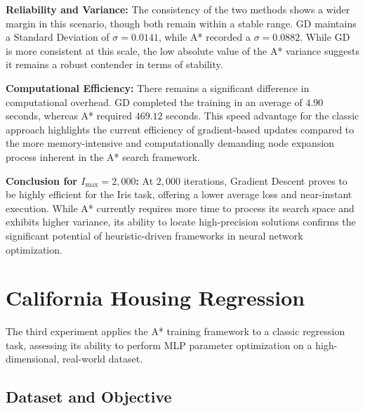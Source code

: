 \noindent \textbf{Reliability and Variance:} The consistency of the two methods shows a wider margin in this scenario, though both remain within a stable range. GD maintains a Standard Deviation of $\sigma = 0.0141$, while A* recorded a $\sigma = 0.0882$. While GD is more consistent at this scale, the low absolute value of the A* variance suggests it remains a robust contender in terms of stability.

\noindent \textbf{Computational Efficiency:} There remains a significant difference in computational overhead. GD completed the training in an average of $4.90$ seconds, whereas A* required $469.12$ seconds. This speed advantage for the classic approach highlights the current efficiency of gradient-based updates compared to the more memory-intensive and computationally demanding node expansion process inherent in the A* search framework.

\noindent \textbf{Conclusion for $I_{\text{max}}=2,000$:} At $2,000$ iterations, Gradient Descent proves to be highly efficient for the Iris task, offering a lower average loss and near-instant execution. While A* currently requires more time to process its search space and exhibits higher variance, its ability to locate high-precision solutions confirms the significant potential of heuristic-driven frameworks in neural network optimization.

 
\newpage

\section{California Housing Regression}
\label{sec:california_housing}

\noindent The third experiment applies the A* training framework to a classic regression task, assessing its ability to perform MLP parameter optimization on a high-dimensional, real-world dataset.

\subsection{Dataset and Objective}

